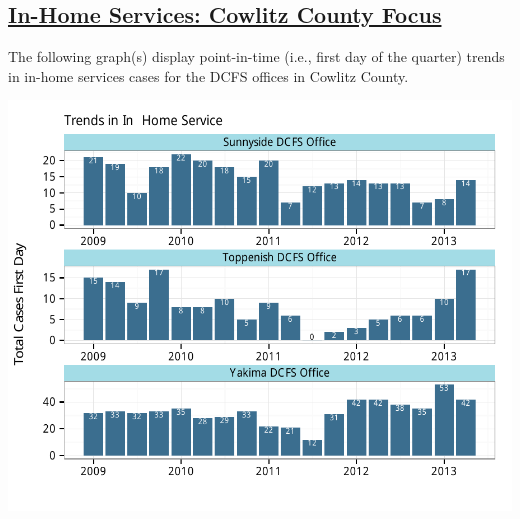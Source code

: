 \documentclass{article}\usepackage[]{graphicx}\usepackage[]{color}
\makeatletter
\def\maxwidth{ %
  \ifdim\Gin@nat@width>\linewidth
    \linewidth
  \else
    \Gin@nat@width
  \fi
}
\newenvironment{knitrout}{}{} %
\makeatother
\begin{document}
\begin{minipage}{\textwidth}
\subsection{\href{http://www.partnersforourchildren.org/child-well-being/visualizations/home-services/trends}
    {In-Home Services: Cowlitz County Focus}
}
The following graph(s) display point-in-time (i.e., first day of the quarter) trends in in-home services cases for the DCFS offices in Cowlitz County. 
\nopagebreak[3]
\begin{knitrout}
\color{fgcolor}

{\centering \includegraphics[width=\maxwidth]{figure/ihs_focus} 

}



\end{knitrout}

\end{minipage}

\newpage
\end{document}
